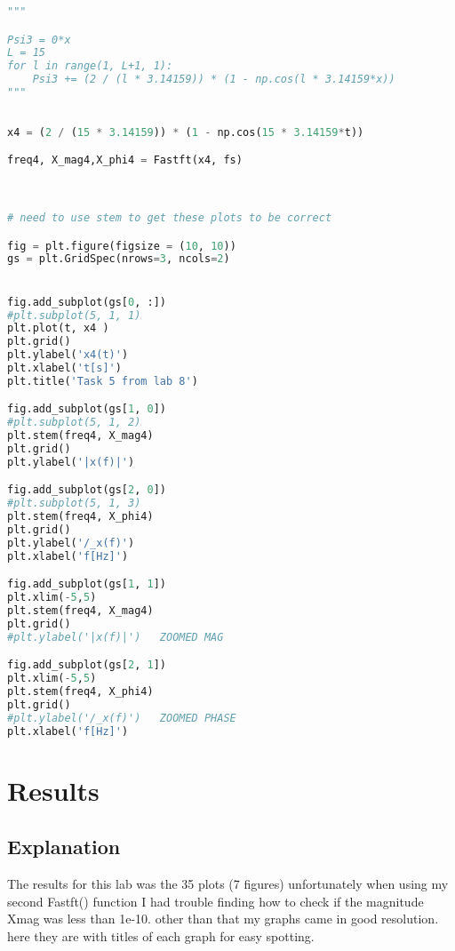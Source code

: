 \documentclass[12pt]{report}
\begin{document}
\begin{lstlisting}[language=Python]
"""

Psi3 = 0*x
L = 15
for l in range(1, L+1, 1):
    Psi3 += (2 / (l * 3.14159)) * (1 - np.cos(l * 3.14159*x))
"""
    
    
x4 = (2 / (15 * 3.14159)) * (1 - np.cos(15 * 3.14159*t))

freq4, X_mag4,X_phi4 = Fastft(x4, fs)



# need to use stem to get these plots to be correct

fig = plt.figure(figsize = (10, 10))
gs = plt.GridSpec(nrows=3, ncols=2)


fig.add_subplot(gs[0, :])
#plt.subplot(5, 1, 1)
plt.plot(t, x4 )
plt.grid()
plt.ylabel('x4(t)')
plt.xlabel('t[s]')
plt.title('Task 5 from lab 8')

fig.add_subplot(gs[1, 0])
#plt.subplot(5, 1, 2)
plt.stem(freq4, X_mag4)
plt.grid()
plt.ylabel('|x(f)|')

fig.add_subplot(gs[2, 0])
#plt.subplot(5, 1, 3)
plt.stem(freq4, X_phi4)
plt.grid()
plt.ylabel('/_x(f)')
plt.xlabel('f[Hz]')

fig.add_subplot(gs[1, 1])
plt.xlim(-5,5)
plt.stem(freq4, X_mag4)
plt.grid()
#plt.ylabel('|x(f)|')   ZOOMED MAG

fig.add_subplot(gs[2, 1])
plt.xlim(-5,5)
plt.stem(freq4, X_phi4)
plt.grid()
#plt.ylabel('/_x(f)')   ZOOMED PHASE
plt.xlabel('f[Hz]')

\end{lstlisting}

\section{Results}
\subsection{Explanation}
The results for this lab was the 35 plots (7 figures) unfortunately when using my second Fastft() function I had trouble finding how to check if the magnitude Xmag was less than 1e-10. other than that my graphs came in good resolution. here they are with titles of each graph for easy spotting. 
\end{document}
